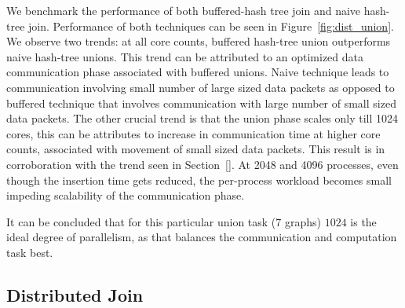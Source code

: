 We benchmark the performance of both buffered-hash tree join and naive hash-tree join. 
Performance of both techniques can be seen in Figure~\ref{fig:dist_union}. We observe two trends: at all core counts, buffered hash-tree union outperforms naive hash-tree unions. This trend can be attributed to an optimized data communication phase associated with buffered unions. Naive technique leads to communication involving small number of large sized data packets as opposed to buffered technique that involves communication with large number of small sized data packets. 
The other crucial trend is that the union phase scales only till 1024 cores, this can be attributes to increase in communication time at higher core counts, associated with movement of small sized data packets. This result is in corroboration with the trend seen in Section~\ref{}. At 2048 and 4096 processes, even though the insertion time gets reduced, the per-process workload becomes small impeding scalability of the communication phase. 

It can be concluded that for this particular union task ($7$ graphs) $1024$ is the ideal degree of parallelism, as that balances the communication and computation task best.




\subsection{Distributed Join}
\label{sec:join}


